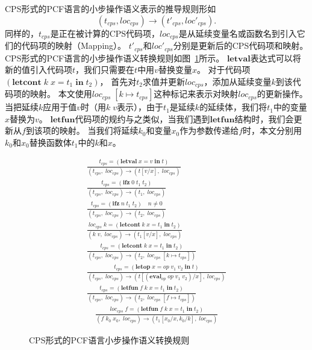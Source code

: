 CPS形式的PCF语言的小步操作语义表示的推导规则形如
\begin{equation}
(t_{cps},loc_{cps})\rightarrow(t'_{cps},loc'_{cps}).
\end{equation}
同样的，$t_{cps}$是正在被计算的CPS代码项，$loc_{cps}$是从延续变量名或函数名到引入它们的代码项的映射（Mapping）。
$t'_{cps}$和$loc'_{cps}$分别是更新后的CPS代码项和映射。
CPS形式的PCF语言的小步操作语义转换规则如图~\ref{cpsopsem}所示。
$\mathbf{letval}$表达式可以将新的值引入代码项$t$，我们只需要在$t$中用$v$替换变量$x$。
对于代码项$(\mathbf{letcont}\; k\; x=t_1\; \mathbf{in}\; t_2)$，
首先对$t_2$求值并更新$loc_{cps}$，添加从延续变量$k$到该代码项的映射。
本文使用$loc_{cps}\; [k\mapsto t_{cps}]$这种标记来表示对映射$loc_{cps}$的更新操作。
当把延续$k$应用于值$v$时（用$k\; v$表示），由于$t_1$是延续$k$的延续体，我们将$t_1$中的变量$x$替换为$v$。
$\mathbf{letfun}$代码项的规约与之类似，当我们遇到$\mathbf{letfun}$结构时，我们会更新从$f$到该项的映射。
当我们将延续$k_0$和变量$x_0$作为参数传递给$f$时，本文分别用$k_0$和$x_0$替换函数体$t_1$中的$k$和$x$。

\begin{figure}[htbp]
    \centering
    \setlength{\jot}{10pt}
    \centering
    \begin{gather*}
        \tag*{cs\_val} \displaystyle{\frac{t_{cps}=(\mathbf{letval}\; x=v\; \mathbf{in}\; t)} {(t_{cps},\; loc_{cps})\rightarrow (t [v/x],\; loc_{cps})}} \\
        \tag*{cs\_if\_zero} \displaystyle{\frac{t_{cps}=(\mathbf{ifz}\; 0\; t_1\; t_2)} {(t_{cps},\; loc_{cps})\rightarrow (t_1,\; loc_{cps})}} \\
        \tag*{cs\_if\_notzero} \displaystyle{\frac{t_{cps}=(\mathbf{ifz}\; n\; t_1\; t_2)\quad n \neq 0} {(t_{cps},\; loc_{cps})\rightarrow (t_2,\; loc_{cps})}} \\
        \tag*{cs\_cont\_app} \displaystyle{\frac{loc_{cps}\; k = (\mathbf{letcont}\; k\; x=t_1\; \mathbf{in}\; t_2)}{(k\; v,\; loc_{cps})\rightarrow (t_1 [v/x],\; loc_{cps})}} \\
        \tag*{cs\_cont} \displaystyle{\frac{t_{cps}=(\mathbf{letcont}\; k\; x=t_1\; \mathbf{in}\; t_2)} {(t_{cps},\; loc_{cps})\rightarrow (t_2,\; loc_{cps}\; [k\mapsto t_{cps}])}} \\
        \tag*{cs\_letop} \displaystyle{\frac{t_{cps}=(\mathbf{letop}\; x=op\; v_1\; v_2\; \mathbf{in}\; t)}{(t_{cps},\; loc_{cps})\rightarrow (t [(\mathbf{eval}_{op}\; op\; v_1\; v_2)/x],\; loc_{cps})}} \\
        \tag*{cs\_fun} \displaystyle{\frac{t_{cps}=(\mathbf{letfun}\; f\; k\; x=t_1\; \mathbf{in}\; t_2)} {(t_{cps},\; loc_{cps})\rightarrow (t_2,\; loc_{cps}\; [f\mapsto t_{cps}])}} \\
        \tag*{cs\_fun\_app} \quad \displaystyle{\frac{loc_{cps}\; f = (\mathbf{letfun}\; f\; k\; x=t_1\; \mathbf{in}\; t_2)}{(f\; k_0\; x_0,\; loc_{cps})\rightarrow (t_1 [x_0/x, k_0/k],\; loc_{cps})}}
    \end{gather*}   
    \caption{CPS形式的PCF语言小步操作语义转换规则}\label{cpsopsem}
\end{figure}

